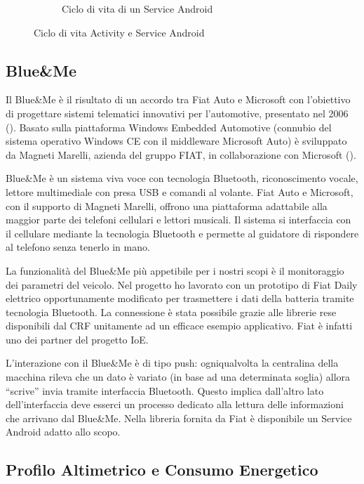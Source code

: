 \begin{figure}[H]
\begin{subfigure}[b]{0.49\textwidth}
			\caption{Ciclo di vita di un Service Android}
			\label{fig:android-service}
		\end{subfigure}
        \caption{Ciclo di vita Activity e Service Android}
\end{figure}

\subsection{Blue\&{}Me}

Il Blue\&{}Me è il risultato di un accordo tra Fiat Auto e Microsoft con l'obiettivo di progettare sistemi telematici innovativi per l'automotive, presentato nel 2006 (\cite{al2012android}). Basato sulla piattaforma Windows Embedded Automotive (connubio del sistema operativo Windows CE con il middleware Microsoft Auto) è sviluppato da Magneti Marelli, azienda del gruppo FIAT, in collaborazione con Microsoft (\cite{wiki:blue-me}).

Blue\&{}Me è un sistema viva voce con tecnologia Bluetooth, riconoscimento vocale, lettore multimediale con presa USB e comandi al volante. Fiat Auto e Microsoft, con il supporto di Magneti Marelli, offrono una piattaforma adattabile alla maggior parte dei telefoni cellulari e lettori musicali. Il sistema si interfaccia con il cellulare mediante la tecnologia Bluetooth e permette al guidatore di rispondere al telefono senza tenerlo in mano. 

La funzionalità del Blue\&{}Me più appetibile per i nostri scopi è il monitoraggio dei parametri del veicolo. Nel progetto ho lavorato con un prototipo di Fiat Daily elettrico opportunamente modificato per trasmettere i dati della batteria tramite tecnologia Bluetooth. La connessione è stata possibile grazie alle librerie rese disponibili dal CRF unitamente ad un efficace esempio applicativo. Fiat è infatti uno dei partner del progetto IoE.

L'interazione con il Blue\&{}Me è di tipo push: ogniqualvolta la centralina della macchina rileva che un dato è variato (in base ad una determinata soglia) allora ``scrive'' invia tramite interfaccia Bluetooth. Questo implica dall'altro lato dell'interfaccia deve esserci un processo dedicato alla lettura delle informazioni che arrivano dal Blue\&{}Me. Nella libreria fornita da Fiat è disponibile un Service Android adatto allo scopo.

\subsection{Profilo Altimetrico e Consumo Energetico}

